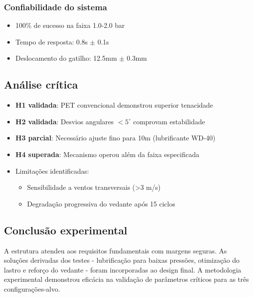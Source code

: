 \subsubsection{Confiabilidade do sistema}
\begin{itemize}
    \item 100\% de sucesso na faixa 1.0-2.0 bar
    \item Tempo de resposta: 0.8s $\pm$ 0.1s
    \item Deslocamento do gatilho: 12.5mm $\pm$ 0.3mm
\end{itemize}

\subsection{Análise crítica}
\begin{itemize}
    \item \textbf{H1 validada}: PET convencional demonstrou superior tenacidade
    \item \textbf{H2 validada}: Desvios angulares $<5^\circ$ comprovam estabilidade
    \item \textbf{H3 parcial}: Necessário ajuste fino para 10m (lubrificante WD-40)
    \item \textbf{H4 superada}: Mecanismo operou além da faixa especificada
    \item Limitações identificadas:
    \begin{itemize}
        \item Sensibilidade a ventos transversais (>3 m/s)
        \item Degradação progressiva do vedante após 15 ciclos
    \end{itemize}
\end{itemize}

\subsection{Conclusão experimental}
A estrutura atendeu aos requisitos fundamentais com margens seguras. As soluções derivadas dos testes - lubrificação para baixas pressões, otimização do lastro e reforço do vedante - foram incorporadas ao design final. A metodologia experimental demonstrou eficácia na validação de parâmetros críticos para as três configurações-alvo.
